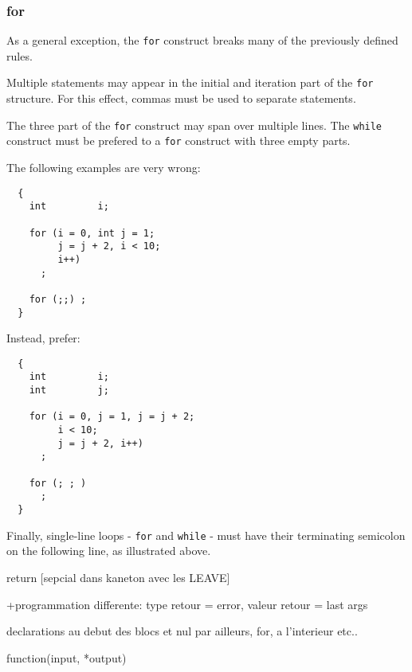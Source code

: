 
\subsubsection{for}

As a general exception, the \texttt{for} construct breaks many of the
previously defined rules.

Multiple statements may appear in the initial and iteration part of the
\texttt{for} structure. For this effect, commas must be used to separate
statements.

The three part of the \texttt{for} construct may span over multiple lines. The
\texttt{while} construct must be prefered to a \texttt{for} construct with
three empty parts.

The following examples are very wrong:

\begin{verbatim}
  {
    int         i;

    for (i = 0, int j = 1;
         j = j + 2, i < 10;
         i++)
      ;

    for (;;) ;
  }
\end{verbatim}

Instead, prefer:

\begin{verbatim}
  {
    int         i;
    int         j;

    for (i = 0, j = 1, j = j + 2;
         i < 10;
         j = j + 2, i++)
      ;

    for (; ; )
      ;
  }
\end{verbatim}

Finally, single-line loops - \texttt{for} and \texttt{while} - must have
their terminating semicolon on the following line, as illustrated above.

%
%

  return [sepcial dans kaneton avec les LEAVE]

+programmation differente: type retour = error, valeur retour = last args

declarations au debut des blocs et nul par ailleurs, for, a l'interieur etc..

function(input, *output)
